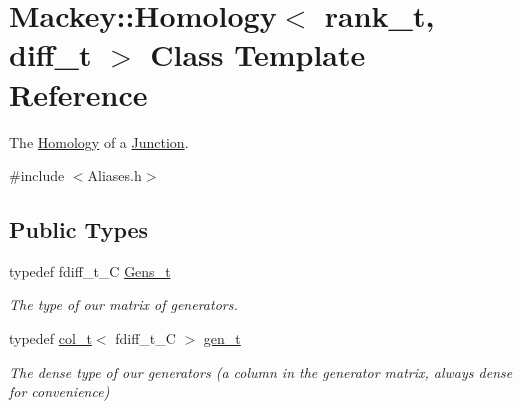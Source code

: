 \hypertarget{classMackey_1_1Homology}{}\section{Mackey\+:\+:Homology$<$ rank\+\_\+t, diff\+\_\+t $>$ Class Template Reference}
\label{classMackey_1_1Homology}


The \hyperlink{classMackey_1_1Homology}{Homology} of a \hyperlink{classMackey_1_1Junction}{Junction}.  




{\ttfamily \#include $<$Aliases.\+h$>$}

\subsection*{Public Types}
\begin{DoxyCompactItemize}
\item 
typedef fdiff\+\_\+t\+\_\+C \hyperlink{classMackey_1_1Homology_a986c3a6644aa52dc8279a26ade42fd64}{Gens\+\_\+t}
\begin{DoxyCompactList}\small\item\em The type of our matrix of generators. \end{DoxyCompactList}\item 
typedef \hyperlink{namespaceMackey_a3374980e3b5001f5ba9b206004180627}{col\+\_\+t}$<$ fdiff\+\_\+t\+\_\+C $>$ \hyperlink{classMackey_1_1Homology_a0f7541ee6181c75cb7efa41f3b63f0a5}{gen\+\_\+t}
\begin{DoxyCompactList}\small\item\em The dense type of our generators (a column in the generator matrix, always dense for convenience) \end{DoxyCompactList}\end{DoxyCompactItemize}
